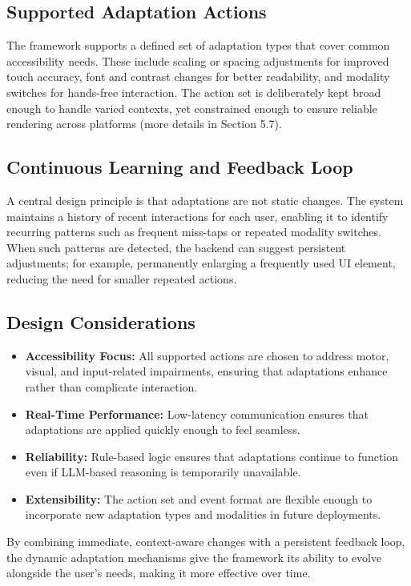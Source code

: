 \documentclass[openany]{book}
\begin{document}
\subsection{Supported Adaptation Actions}
The framework supports a defined set of adaptation types that cover common accessibility needs. These include scaling or spacing adjustments for improved touch accuracy, font and contrast changes for better readability, and modality switches for hands-free interaction. The action set is deliberately kept broad enough to handle varied contexts, yet constrained enough to ensure reliable rendering across platforms (more details in Section 5.7).

\subsection{Continuous Learning and Feedback Loop}
A central design principle is that adaptations are not static changes. The system maintains a history of recent interactions for each user, enabling it to identify recurring patterns such as frequent miss-taps or repeated modality switches. When such patterns are detected, the backend can suggest persistent adjustments; for example, permanently enlarging a frequently used UI element, reducing the need for smaller repeated actions.

\subsection{Design Considerations}
\begin{itemize}
    \item \textbf{Accessibility Focus:} All supported actions are chosen to address motor, visual, and input-related impairments, ensuring that adaptations enhance rather than complicate interaction.
    \item \textbf{Real-Time Performance:} Low-latency communication ensures that adaptations are applied quickly enough to feel seamless.
    \item \textbf{Reliability:} Rule-based logic ensures that adaptations continue to function even if LLM-based reasoning is temporarily unavailable.
    \item \textbf{Extensibility:} The action set and event format are flexible enough to incorporate new adaptation types and modalities in future deployments.
\end{itemize}
By combining immediate, context-aware changes with a persistent feedback loop, the dynamic adaptation mechanisms give the framework its ability to evolve alongside the user’s needs, making it more effective over time.
\end{document}
